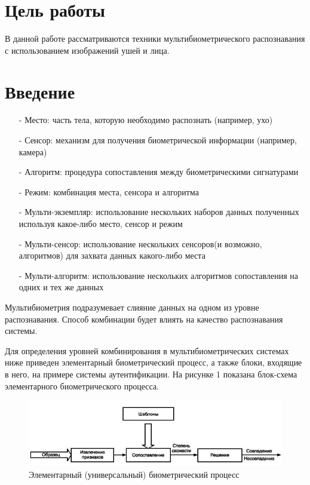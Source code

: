 \documentclass[12pt,a4paper]{article}					%
\begin{document}


\newpage
\tableofcontents
\newpage


\section{Цель работы}

В данной работе рассматриваются техники мультибиометрического распознавания с использованием изображений ушей и лица.



\section{Введение}

\begin{itemize}

\item[-] Место: часть тела, которую необходимо распознать (например, ухо)
\item[-] Сенсор: механизм для получения биометрической информации (например, камера)
\item[-] Алгоритм: процедура сопоставления между биометрическими сигнатурами
\item[-] Режим: комбинация места, сенсора и алгоритма
\item[-] Мульти-экземпляр: использование нескольких наборов данных полученных используя какое-либо место, сенсор и режим
\item[-] Мульти-сенсор: использование нескольких сенсоров(и возможно, алгоритмов) для захвата данных какого-либо места
\item[-] Мульти-алгоритм: использование нескольких алгоритмов сопоставления на одних и тех же данных

\end{itemize}

Мультибиометрия подразумевает слияние данных на одном из уровне распознавания.
Способ комбинации будет влиять на качество распознавания системы.

Для определения уровней комбинирования в мультибиометрических системах ниже приведен элементарный биометрический процесс, а также блоки, входящие в него, на примере системы аутентификации. 
На рисунке 1 показана блок-схема элементарного биометрического процесса.

\begin{figure}[h!]
\centering
\includegraphics[scale=0.60]{res/bio_process}
\caption{Элементарный (универсальный) биометрический процесс}
\end{figure}
\end{document}
